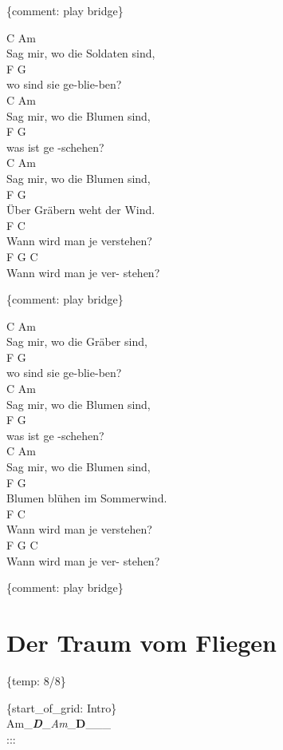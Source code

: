 \documentclass[
  letterpaper,
]{scrbook}
\begin{document}
\{comment: play bridge\}

C Am\\
Sag mir, wo die Soldaten sind,\\
F G\\
wo sind sie ge-blie-ben?\\
C Am\\
Sag mir, wo die Blumen sind,\\
F G\\
was ist ge -schehen?\\
C Am\\
Sag mir, wo die Blumen sind,\\
F G\\
Über Gräbern weht der Wind.\\
F C\\
Wann wird man je verstehen?\\
F G C\\
Wann wird man je ver- stehen?

\{comment: play bridge\}

C Am\\
Sag mir, wo die Gräber sind,\\
F G\\
wo sind sie ge-blie-ben?\\
C Am\\
Sag mir, wo die Blumen sind,\\
F G\\
was ist ge -schehen?\\
C Am\\
Sag mir, wo die Blumen sind,\\
F G\\
Blumen blühen im Sommerwind.\\
F C\\
Wann wird man je verstehen?\\
F G C\\
Wann wird man je ver- stehen?

\{comment: play bridge\}

\hypertarget{der-traum-vom-fliegen}{%
\chapter{Der Traum vom Fliegen}\label{der-traum-vom-fliegen}}

\{temp: 8/8\}

\{start\_of\_grid: Intro\}\\
Am\_\textbf{\emph{\textbar D}}\_\emph{\textbar Am}\_\textbf{\textbar D}\_\_\_\textbar{}\\
:::
\end{document}
